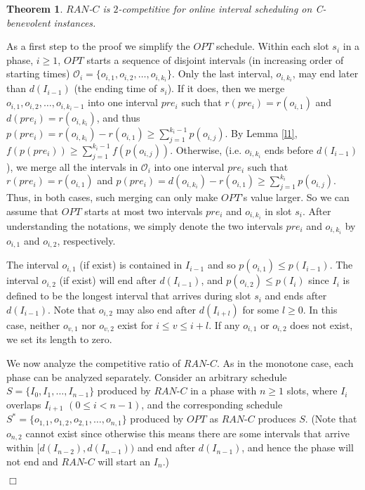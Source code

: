 \documentclass[11pt]{article}
\newtheorem{theorem}{Theorem}[section]
\newcommand{\qed}{\hspace*{\fill}$\Box$\par\medskip}
\newenvironment{proof}{\noindent{\it Proof. }\ignorespaces}{\qed}
\begin{document}
\begin{theorem} 
$RAN$-$C$ is $2$-competitive for online interval scheduling on 
C-benevolent instances.
\end{theorem}
\begin{proof}
As a first step to the proof we simplify the $OPT$ schedule.
Within each slot $s_i$ in a phase, $i \ge 1$,
$OPT$ starts a sequence of disjoint intervals 
(in increasing order of starting times)
$\mathcal{O}_i=\{o_{i,1},o_{i,2},\ldots,o_{i,k_i}\}$.
Only the last interval, $o_{i,k_i}$, may end later than
$d(I_{i-1})$ (the ending time of $s_i$). 
If it does, then we merge $o_{i,1},o_{i,2},\ldots,o_{i,k_i-1}$ into 
one interval $pre_i$ such that $r(pre_i) = r(o_{i,1})$ and 
$d(pre_i) = r(o_{i,k_i})$, and thus
$p(pre_i) = r(o_{i,k_i})-r(o_{i,1}) \geq \sum^{k_i-1}_{j=1}
p(o_{i,j})$.  
By Lemma \ref{l1}, $f(p(pre_i)) \geq
\sum^{k_i-1}_{j=1} f(p(o_{i,j}))$. 
Otherwise, (i.e. $o_{i,k_i}$ ends before $d(I_{i-1})$), we merge all 
the intervals in $\mathcal{O}_i$ into one interval $pre_i$ such that
$r(pre_i) = r(o_{i,1})$ and
$p(pre_i) = d(o_{i,k_i}) - r(o_{i,1}) \geq \sum^{k_i}_{j=1}
p(o_{i,j})$.  
Thus, in both cases, such merging can only make $OPT$'s value larger.  
So we can assume that $OPT$ starts at most two intervals $pre_i$ and
$o_{i,k_i}$ in slot $s_i$.
After understanding the notations, we simply denote
the two intervals $pre_i$ and $o_{i,k_i}$ by $o_{i,1}$ and
$o_{i,2}$, respectively. 

The interval $o_{i,1}$ (if exist) is contained in $I_{i-1}$ and so
$p(o_{i,1}) \leq p(I_{i-1})$.
The interval $o_{i,2}$ (if exist) will end after $d(I_{i-1})$,
and $p(o_{i,2}) \leq p(I_{i})$ 
since $I_{i}$ is defined to be the longest interval that arrives
during slot $s_i$ and ends after $d(I_{i-1})$.
Note that $o_{i,2}$ may also end after $d(I_{i+l})$ for some $l\geq 0$. 
In this case, neither $o_{v,1}$ nor $o_{v,2}$ exist 
for $i \leq v \leq i+l$. 
If any $o_{i,1}$ or $o_{i,2}$ does not exist,
we set its length to zero. 


We now analyze the competitive ratio of $RAN$-$C$.
As in the monotone case, each phase can be analyzed separately.
Consider an arbitrary schedule
$S = \{I_0, I_1, \ldots, I_{n-1} \}$ produced by $RAN$-$C$ in a phase
with $n \ge 1$ slots, where $I_i$ overlaps $I_{i+1}$ $(0 \leq i < n-1)$, 
and the corresponding schedule
$S^* = \{o_{1,1}, o_{1,2}, o_{2,1}, \ldots, o_{n,1} \}$
produced by $OPT$ as $RAN$-$C$ produces $S$.
(Note that 
$o_{n,2}$ cannot
exist since otherwise this means there are some intervals that arrive 
within $[d(I_{n-2}),d(I_{n-1}))$ and end after $d(I_{n-1})$, and hence 
the phase will not end and $RAN$-$C$ will start an $I_n$.)


\end{proof}
\end{document}
